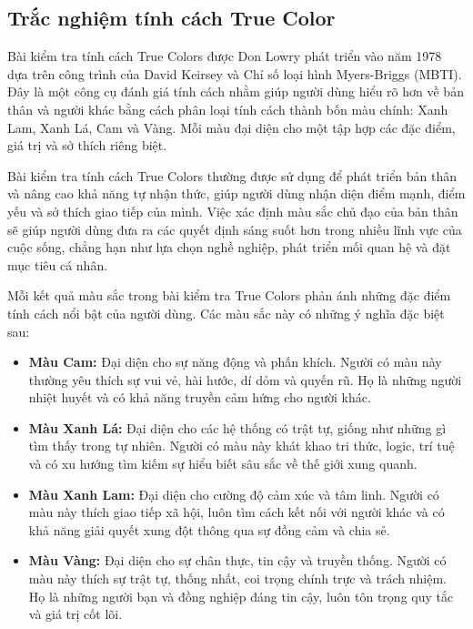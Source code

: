 \subsection{Trắc nghiệm tính cách True Color}

Bài kiểm tra tính cách True Colors được Don Lowry phát triển vào năm 1978 dựa trên công trình của David Keirsey và Chỉ số loại hình Myers-Briggs (MBTI). Đây là một công cụ đánh giá tính cách nhằm giúp người dùng hiểu rõ hơn về bản thân và người khác bằng cách phân loại tính cách thành bốn màu chính: Xanh Lam, Xanh Lá, Cam và Vàng. Mỗi màu đại diện cho một tập hợp các đặc điểm, giá trị và sở thích riêng biệt.

Bài kiểm tra tính cách True Colors thường được sử dụng để phát triển bản thân và nâng cao khả năng tự nhận thức, giúp người dùng nhận diện điểm mạnh, điểm yếu và sở thích giao tiếp của mình. Việc xác định màu sắc chủ đạo của bản thân sẽ giúp người dùng đưa ra các quyết định sáng suốt hơn trong nhiều lĩnh vực của cuộc sống, chẳng hạn như lựa chọn nghề nghiệp, phát triển mối quan hệ và đặt mục tiêu cá nhân.

Mỗi kết quả màu sắc trong bài kiểm tra True Colors phản ánh những đặc điểm tính cách nổi bật của người dùng. Các màu sắc này có những ý nghĩa đặc biệt sau:

\begin{itemize}
    \item \textbf{Màu Cam:} Đại diện cho sự năng động và phấn khích. Người có màu này thường yêu thích sự vui vẻ, hài hước, dí dỏm và quyến rũ. Họ là những người nhiệt huyết và có khả năng truyền cảm hứng cho người khác.
    \item \textbf{Màu Xanh Lá:} Đại diện cho các hệ thống có trật tự, giống như những gì tìm thấy trong tự nhiên. Người có màu này khát khao tri thức, logic, trí tuệ và có xu hướng tìm kiếm sự hiểu biết sâu sắc về thế giới xung quanh.
    \item \textbf{Màu Xanh Lam:} Đại diện cho cường độ cảm xúc và tâm linh. Người có màu này thích giao tiếp xã hội, luôn tìm cách kết nối với người khác và có khả năng giải quyết xung đột thông qua sự đồng cảm và chia sẻ.
    \item \textbf{Màu Vàng:} Đại diện cho sự chân thực, tin cậy và truyền thống. Người có màu này thích sự trật tự, thống nhất, coi trọng chính trực và trách nhiệm. Họ là những người bạn và đồng nghiệp đáng tin cậy, luôn tôn trọng quy tắc và giá trị cốt lõi.
\end{itemize}

